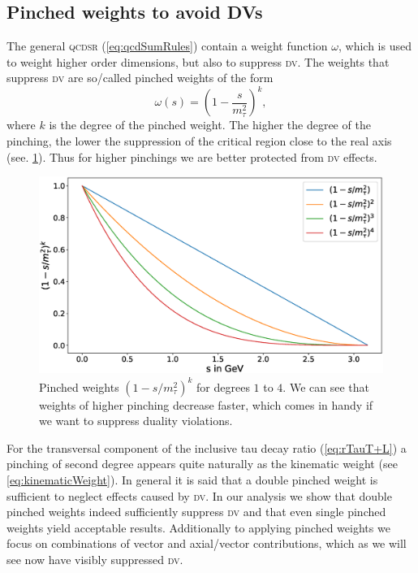 \documentclass[../../index.tex]{subfiles}
\begin{document}
\subsection{Pinched weights to avoid DVs}
\label{sec:pinchedWeights}
The general \textsc{qcdsr} (\cref{eq:qcdSumRules}) contain a weight function
\(\omega\), which is used to weight higher order dimensions, but also to
suppress \textsc{dv}. The weights that suppress \textsc{dv} are so\-/called
pinched weights of the form
\begin{equation}
  \omega(s) = \left(1-\frac{s}{m_\tau^2}\right)^k,
\end{equation}
where \(k\) is the degree of the pinched weight. The higher the degree of the
pinching, the lower the suppression of the critical region close to the real
axis (see. \cref{fig:monomialWeightGraphs}). Thus for higher pinchings we are
better protected from \textsc{dv} effects.
\begin{figure}
  \centering
  \includegraphics[width=\textwidth]{./images/monomialWeightGraphs.eps}
  \caption{Pinched weights \((1-s/m_\tau^2)^k\) for degrees \(1\) to \(4\). We
    can see that weights of higher pinching decrease faster, which comes in
    handy if we want to suppress duality violations.}
  \label{fig:monomialWeightGraphs}
\end{figure}
For the transversal component of the inclusive tau decay ratio
(\cref{eq:rTauT+L}) a pinching of second degree appears quite naturally as the
kinematic weight (see \cref{eq:kinematicWeight}). In general it is said that a
double pinched weight is sufficient to neglect effects caused by \textsc{dv}. In
our analysis we show that double pinched weights indeed sufficiently suppress
\textsc{dv} and that even single pinched weights yield acceptable results.
Additionally to applying pinched weights we focus on combinations of vector and
axial\-/vector contributions, which as we will see now have visibly suppressed
\textsc{dv}.
\end{document}
